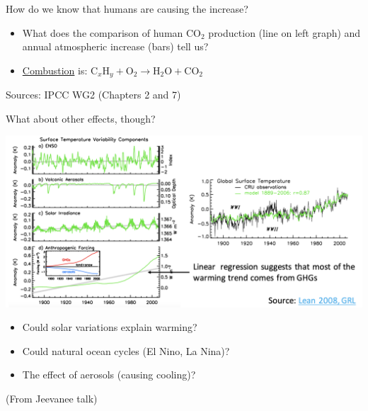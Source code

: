 \documentclass[12pt]{beamer}
\begin{document}
\begin{frame}{How do we know that humans are causing the increase?}


\begin{itemize}
\item What does the comparison of human $\text{CO}_2$ production (line on left graph) and annual atmospheric increase (bars) tell us?
\item \underline{Combustion} is: $\text{C}_x \text{H}_y  + \text{O}_2 \rightarrow \text{H}_2 \text{O} + \text{CO}_2$
\end{itemize}

\vfill
{\tiny Sources: IPCC WG2 (Chapters 2 and 7)}

\end{frame}
\begin{frame}{What about other effects, though?}

\begin{center}
\includegraphics[width=\textwidth]{images/jeevanjee_forcings_slide8.png}
\end{center}
%



\begin{itemize}
\item Could solar variations explain warming?
\item Could natural ocean cycles (El Nino, La Nina)?
\item The effect of aerosols (causing cooling)?
\end{itemize}
\vfill
{\tiny (From Jeevanee talk)}
\end{frame}
\end{document}
